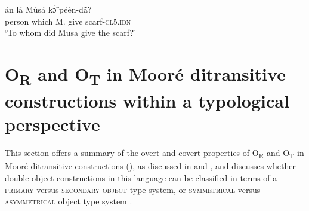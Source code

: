 \documentclass[output=paper]{langsci/langscibook}
\begin{document}
\ea
\label{ex:46.pacchiarotti}
\gll án    lá    Músá  kɔ̃́  péén-d\`{ã}? \\
person  which    M.  give  scarf-\textsc{cl5.idn}\\
\glt `To whom did Musa give the scarf?'
\z

\section{O\textsubscript{R} and O\textsubscript{T} in Mooré ditransitive constructions within a typological perspective}\label{§6:or.pacchiarotti}

This section offers a summary of the overt and covert properties of O\textsubscript{R} and O\textsubscript{T} in Mooré ditransitive constructions (), as discussed in  and , and discusses whether double-object constructions in this language can be classified in terms of a \textsc{primary} versus \textsc{secondary object} \citep{dryer1986} type system, or \textsc{symmetrical} versus \textsc{asymmetrical} object type system \citep{bresnanmoshi1990}.
\end{document}
